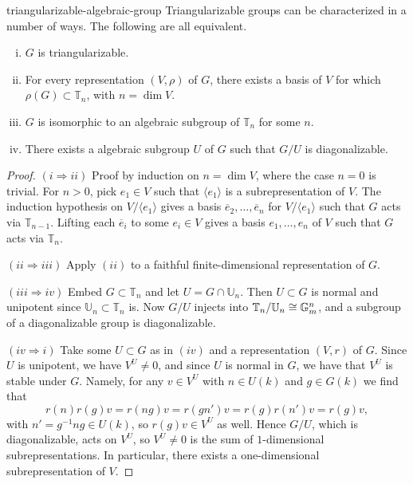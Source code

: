 \begin{example}{triangularizable-algebraic-group}
    Triangularizable groups can be characterized in a number of ways. The following are all equivalent.
    \begin{enumerate}[(i)]
        \item $G$ is triangularizable.
        \item For every representation $(V, \rho)$ of $G$, there exists a basis of $V$ for which $\rho(G) \subset \mathbb{T}_n$, with $n = \dim V$.
        \item $G$ is isomorphic to an algebraic subgroup of $\mathbb{T}_n$ for some $n$.
        \item There exists a   algebraic subgroup $U$ of $G$ such that $G/U$ is diagonalizable.
    \end{enumerate}
    \begin{proof}
        $(i \Rightarrow ii)$ Proof by induction on $n = \dim V$, where the case $n = 0$ is trivial. For $n > 0$, pick $e_1 \in V$ such that $\langle e_1 \rangle$ is a subrepresentation of $V$. The induction hypothesis on $V / \langle e_1 \rangle$ gives a basis $\overline{e}_2, \ldots, \overline{e}_n$ for $V / \langle e_1 \rangle$ such that $G$ acts via $\mathbb{T}_{n - 1}$. Lifting each $\overline{e}_i$ to some $e_i \in V$ gives a basis $e_1, \ldots, e_n$ of $V$ such that $G$ acts via $\mathbb{T}_n$.
        
        $(ii \Rightarrow iii)$ Apply $(ii)$ to a faithful finite-dimensional representation of $G$.
        
        $(iii \Rightarrow iv)$ Embed $G \subset \mathbb{T}_n$ and let $U = G \cap \mathbb{U}_n$. Then $U \subset G$ is normal and unipotent since $\mathbb{U}_n \subset \mathbb{T}_n$ is. Now $G/U$ injects into $\mathbb{T}_n/\mathbb{U}_n \cong \mathbb{G}_m^n$, and a subgroup of a diagonalizable group is diagonalizable.
        
        $(iv \Rightarrow i)$ Take some $U \subset G$ as in $(iv)$ and a representation $(V, r)$ of $G$. Since $U$ is unipotent, we have $V^U \ne 0$, and since $U$ is normal in $G$, we have that $V^U$ is stable under $G$. Namely, for any $v \in V^U$ with $n \in U(k)$ and $g \in G(k)$ we find that
        \[ r(n) r(g) v = r(ng) v = r(gn') v = r(g) r(n') v = r(g) v , \]
        with $n' = g^{-1} n g \in U(k)$, so $r(g) v \in V^U$ as well. Hence $G/U$, which is diagonalizable, acts on $V^U$, so $V^U \ne 0$ is the sum of $1$-dimensional subrepresentations. In particular, there exists a one-dimensional subrepresentation of $V$.
    \end{proof}
\end{example}

